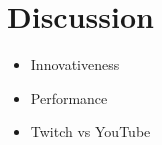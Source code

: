 \section{Discussion}
\begin{itemize}
    \item Innovativeness
    \item Performance
    \item Twitch vs YouTube
    
\end{itemize}